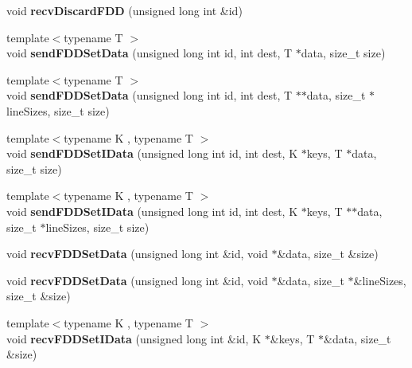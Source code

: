 \begin{DoxyCompactItemize}
void {\bfseries recv\+Discard\+F\+DD} (unsigned long int \&id)
\item 
\hypertarget{classfaster_1_1fastComm_acc7534571a62d6df7c4f7a13d69b9e41}{}\label{classfaster_1_1fastComm_acc7534571a62d6df7c4f7a13d69b9e41} 
{\footnotesize template$<$typename T $>$ }\\void {\bfseries send\+F\+D\+D\+Set\+Data} (unsigned long int id, int dest, T $\ast$data, size\+\_\+t size)
\item 
\hypertarget{classfaster_1_1fastComm_a71e3ddff08c78a0a0e4cfb03f3ebf63c}{}\label{classfaster_1_1fastComm_a71e3ddff08c78a0a0e4cfb03f3ebf63c} 
{\footnotesize template$<$typename T $>$ }\\void {\bfseries send\+F\+D\+D\+Set\+Data} (unsigned long int id, int dest, T $\ast$$\ast$data, size\+\_\+t $\ast$line\+Sizes, size\+\_\+t size)
\item 
\hypertarget{classfaster_1_1fastComm_aeaf4e75975319f16c3c9544b8ab9309e}{}\label{classfaster_1_1fastComm_aeaf4e75975319f16c3c9544b8ab9309e} 
{\footnotesize template$<$typename K , typename T $>$ }\\void {\bfseries send\+F\+D\+D\+Set\+I\+Data} (unsigned long int id, int dest, K $\ast$keys, T $\ast$data, size\+\_\+t size)
\item 
\hypertarget{classfaster_1_1fastComm_aa1937f0dfe57c88c95c3c03596df3298}{}\label{classfaster_1_1fastComm_aa1937f0dfe57c88c95c3c03596df3298} 
{\footnotesize template$<$typename K , typename T $>$ }\\void {\bfseries send\+F\+D\+D\+Set\+I\+Data} (unsigned long int id, int dest, K $\ast$keys, T $\ast$$\ast$data, size\+\_\+t $\ast$line\+Sizes, size\+\_\+t size)
\item 
\hypertarget{classfaster_1_1fastComm_aa370d793025cbed0d74391a8e6dccf46}{}\label{classfaster_1_1fastComm_aa370d793025cbed0d74391a8e6dccf46} 
void {\bfseries recv\+F\+D\+D\+Set\+Data} (unsigned long int \&id, void $\ast$\&data, size\+\_\+t \&size)
\item 
\hypertarget{classfaster_1_1fastComm_abe5fb47fb54ef8bea608eec1ccbbcae6}{}\label{classfaster_1_1fastComm_abe5fb47fb54ef8bea608eec1ccbbcae6} 
void {\bfseries recv\+F\+D\+D\+Set\+Data} (unsigned long int \&id, void $\ast$\&data, size\+\_\+t $\ast$\&line\+Sizes, size\+\_\+t \&size)
\item 
\hypertarget{classfaster_1_1fastComm_ae234c6735666e85789aafc82120c0f0f}{}\label{classfaster_1_1fastComm_ae234c6735666e85789aafc82120c0f0f} 
{\footnotesize template$<$typename K , typename T $>$ }\\void {\bfseries recv\+F\+D\+D\+Set\+I\+Data} (unsigned long int \&id, K $\ast$\&keys, T $\ast$\&data, size\+\_\+t \&size)

\end{DoxyCompactItemize}

